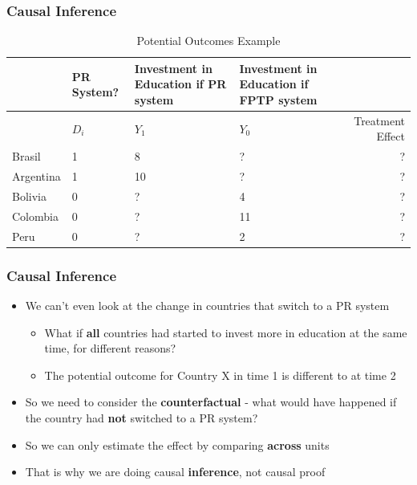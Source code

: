 \documentclass[xcolor=x11names,compress]{beamer}\usepackage[]{graphicx}\usepackage[]{color}
\renewcommand{\(}{\begin{columns}}
\renewcommand{\)}{\end{columns}}
\newcommand{\<}[1]{\begin{column}{#1}}
\renewcommand{\>}{\end{column}}
\begin{document}
\begin{frame}
\frametitle{Causal Inference}
\footnotesize
\begin{table}[htbp]
  \centering
  \caption{Potential Outcomes Example}
    \begin{tabular}{|p{1.8cm}|p{2.2cm}|p{2.2cm}|p{1.8cm}|r|}
    \hline
          & \multicolumn{1}{p{1.8cm}|}{PR System?} & \multicolumn{1}{p{2.2cm}|}{Investment in Education if PR system} & \multicolumn{1}{p{2.2cm}|}{Investment in Education if FPTP system} &  \bigstrut\\
    \hline
          & \multicolumn{1}{p{1.8cm}|}{$D_i$} & \multicolumn{1}{p{2.2cm}|}{$Y_1$} & \multicolumn{1}{p{2.2cm}|}{$Y_0$} & \multicolumn{1}{p{1.8cm}|}{Treatment Effect} \bigstrut\\
    \hline
    Brasil & 1 & 8     & ?      & ? \bigstrut\\
    \hline
    Argentina & 1 & 10    & ?      & ? \bigstrut\\
    \hline
    Bolivia & 0 & ?     & 4     & ? \bigstrut\\
    \hline
    Colombia & 0 &  ?   & 11    & ? \bigstrut\\
    \hline
    Peru & 0 & ?     & 2     & ? \bigstrut\\
    \hline
    \end{tabular}%
  \label{tab:addlabel}%
\end{table}%
\normalsize
\end{frame}

\begin{frame}
\frametitle{Causal Inference}
\begin{itemize}
\item We can't even look at the change in countries that switch to a PR system
\begin{itemize}
\item What if \textbf{all} countries had started to invest more in education at the same time, for different reasons?
\item The potential outcome for Country X in time 1 is different to at time 2
\end{itemize}
\item So we need to consider the \textbf{counterfactual} - what would have happened if the country had \textbf{not} switched to a PR system?
\item So we can only estimate the effect by comparing \textbf{across} units
\item That is why we are doing causal \textbf{inference}, not causal proof
\end{itemize}
\end{frame}
\end{document}
